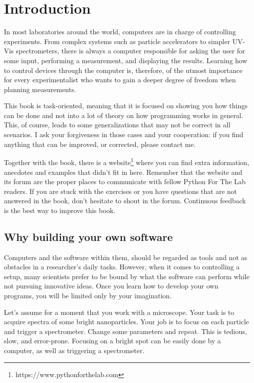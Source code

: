 \chapter{Introduction}\label{chapter:introduction}
In most laboratories around the world, computers are in charge of controlling experiments. From complex systems such as particle accelerators to simpler UV-Vis spectrometers, there is always a computer responsible for asking the user for some input, performing a measurement, and displaying the results. Learning how to control devices through the computer is, therefore, of the utmost importance for every experimentalist who wants to gain a deeper degree of freedom when planning measurements. 

This book is task-oriented, meaning that it is focused on showing you how things can be done and not into a lot of theory on how programming works in general. This, of course, leads to some generalizations that may not be correct in all scenarios. I ask your forgiveness in those cases and your cooperation: if you find anything that can be improved, or corrected, please contact me.

Together with the book, there is a website\footnote{https://www.pythonforthelab.com} where you can find extra information, anecdotes and examples that didn’t fit in here. Remember that the website and its forum are the proper places to communicate with fellow Python For The Lab readers. If you are stuck with the exercises or you have questions that are not answered in the book, don’t hesitate to shout in the forum. Continuous feedback is the best way to improve this book. 

\section{Why building your own software}
Computers and the software within them, should be regarded as tools and not as obstacles in a researcher's daily tasks. However, when it comes to controlling a setup, many scientists prefer to be bound by what the software can perform while not pursuing innovative ideas. Once you learn how to develop your own programs, you will be limited only by your imagination. 

Let's assume for a moment that you work with a microscope. Your task is to acquire spectra of some bright nanoparticles. Your job is to focus on each particle and trigger a spectrometer. Change some parameters and repeat. This is tedious, slow, and error-prone. Focusing on a bright spot can be easily done by a computer, as well as triggering a spectrometer. 

